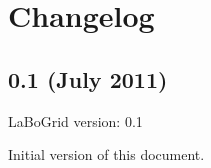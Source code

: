\chapter*{Changelog}

\section*{0.1 (July 2011)}

\noindent
LaBoGrid version: 0.1

Initial version of this document.
